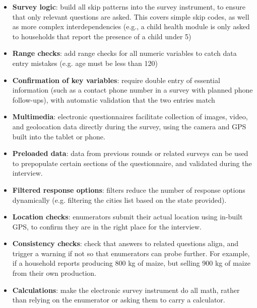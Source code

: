 \begin{itemize}
	\item{\textbf{Survey logic}}: build all skip patterns into the survey instrument, to ensure that only relevant questions are asked. This covers simple skip codes, as well as more complex interdependencies (e.g., a child health module is only asked to households that report the presence of a child under 5)
	\item{\textbf{Range checks}}:  add range checks for all numeric variables to catch data entry mistakes (e.g. age must be less than 120)
	\item{\textbf{Confirmation of key variables}}: require double entry of essential information (such as a contact phone number in a survey with planned phone follow-ups), with automatic validation that the two entries match
	\item{\textbf{Multimedia}}: electronic questionnaires facilitate collection of images, video, and geolocation data directly during the survey, using the camera and GPS built into the tablet or phone.
	\item{\textbf{Preloaded data}}: data from previous rounds or related surveys can be used to prepopulate certain sections of the questionnaire, and validated during the interview.
	\item{\textbf{Filtered response options}}: filters reduce the number of response options dynamically (e.g. filtering the cities list based on the state provided).
	\item{\textbf{Location checks}}: enumerators submit their actual location using in-built GPS, to confirm they are in the right place for the interview.
	\item{\textbf{Consistency checks}}: check that answers to related questions align, and trigger a warning if not so that enumerators can probe further. For example, if a household reports producing 800 kg of maize, but selling 900 kg of maize from their own production.
	\item{\textbf{Calculations}}: make the electronic survey instrument do all math, rather than relying on the enumerator or asking them to carry a calculator.
\end{itemize}

